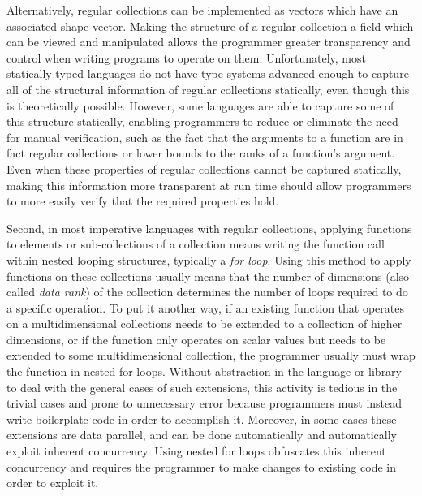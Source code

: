 Alternatively, regular collections can be implemented as vectors which have an associated shape vector. 
Making the structure of a regular collection a field which can be viewed and manipulated 
allows the programmer greater transparency and control when writing programs to operate on them.
Unfortunately, most statically-typed languages do not have type systems advanced enough 
to capture all of the structural information of regular collections statically, even though this is theoretically possible. %
However, some languages are able to capture some of this structure statically, \cite{boost} \cite{sac} \cite{dph}
enabling programmers to reduce or eliminate the need for manual verification, 
such as the fact that the arguments to a function are in fact regular collections or lower bounds to the ranks of a function's argument.
Even when these properties of regular collections cannot be captured statically, making this information more transparent at run time 
should allow programmers to more easily verify that the required properties hold.

Second, in most imperative languages with regular collections, 
applying functions to elements or sub-collections of a collection means 
writing the function call within nested looping structures, typically a \textit{for loop}.
Using this method to apply functions on these collections usually means that 
the number of dimensions (also called \textit{data rank}) of the collection 
determines the number of loops required to do a specific operation.
To put it another way, if an existing function that operates on a multidimensional collections 
needs to be extended to a collection of higher dimensions, 
or if the function only operates on scalar values but needs to be extended to some multidimensional collection, 
the programmer usually must wrap the function in nested for loops.
Without abstraction in the language or library to deal with the general cases of such extensions, 
this activity is tedious %
in the trivial cases and prone to unnecessary error 
because programmers must instead write boilerplate code %
in order to accomplish it.
Moreover, in some cases these extensions are data parallel, 
and can be done automatically and automatically exploit inherent concurrency.
Using nested for loops obfuscates this inherent concurrency and 
requires the programmer to make changes to existing code in order to exploit it. %

